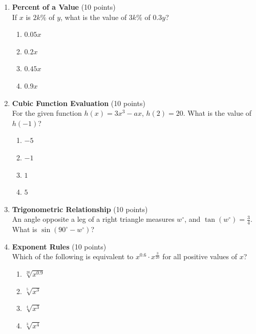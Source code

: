 \begin{enumerate}
  \item \textbf{Percent of a Value} (10 points)\\
  If $x$ is $2k\%$ of $y$, what is the value of $3k\%$ of $0.3y$?
  \begin{enumerate}[label=\Alph*.]
    \item $0.05x$
    \item $0.2x$
    \item $0.45x$
    \item $0.9x$
  \end{enumerate}
  \begin{subanswer}
  \end{subanswer}

  \item \textbf{Cubic Function Evaluation} (10 points)\\
  For the given function $h(x) = 3x^3 - a x$, $h(2) = 20$. What is the value of $h(-1)$?
  \begin{enumerate}[label=\Alph*.]
    \item $-5$
    \item $-1$
    \item $1$
    \item $5$
  \end{enumerate}
  \begin{subanswer}
  \end{subanswer}

  \item \textbf{Trigonometric Relationship} (10 points)\\
  An angle opposite a leg of a right triangle measures $w^\circ$, and $\tan(w^\circ) = \frac{3}{4}$. What is $\sin(90^\circ - w^\circ)$?
  \begin{subanswer}
  \end{subanswer}

  \newpage

  \item \textbf{Exponent Rules} (10 points)\\
  Which of the following is equivalent to $x^{0.6} \cdot x^{\frac{3}{20}}$ for all positive values of $x$?
  \begin{enumerate}[label=\Alph*.]
    \item $\sqrt[20]{x^{0.9}}$
    \item $\sqrt[5]{x^3}$
    \item $\sqrt[4]{x^3}$
    \item $\sqrt[3]{x^4}$
  \end{enumerate}
  \begin{subanswer}
  \end{subanswer}


\end{enumerate}
